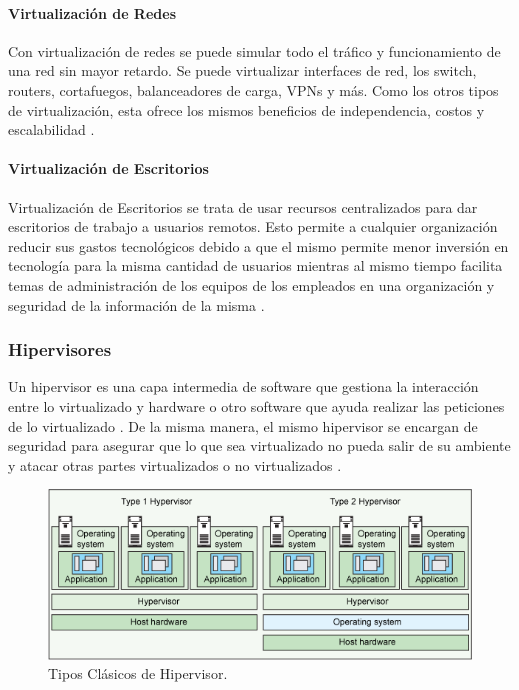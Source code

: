 \paragraph{Virtualización de Redes}
Con virtualización de redes se puede simular todo el tráfico y funcionamiento de una red sin mayor retardo. Se puede virtualizar interfaces de red, los switch, routers, cortafuegos, balanceadores de carga, VPNs y más. Como los otros tipos de virtualización, esta ofrece los mismos beneficios de independencia, costos y escalabilidad \citep{VMWare-Virtualization}.

\paragraph{Virtualización de Escritorios}
Virtualización de Escritorios se trata de usar recursos centralizados para dar escritorios de trabajo a usuarios remotos. Esto permite a cualquier organización reducir sus gastos tecnológicos debido a que el mismo permite menor inversión en tecnología para la misma cantidad de usuarios mientras al mismo tiempo facilita temas de administración de los equipos de los empleados en una organización y seguridad de la información de la misma \citep{VMWare-Virtualization}.

\subsubsection{Hipervisores}
Un hipervisor es una capa intermedia de software que gestiona la interacción entre lo virtualizado y hardware o otro software que ayuda realizar las peticiones de lo virtualizado \citep{VMWare-Virtualization}. De la misma manera, el mismo hipervisor se encargan de seguridad para asegurar que lo que sea virtualizado no pueda salir de su ambiente y atacar otras partes virtualizados o no virtualizados \citep{VMWare-HypervisorSecurity} \citep{IBM-KVM-Security}.

\begin{figure}
  \begin{center}
      \includegraphics[width=\textwidth]{Figures/ibm-hypervisortypes.png}
  \end{center}
  \caption{Tipos Clásicos de Hipervisor.} 
  \label{IBM-HypervisorTypes}
\end{figure}

